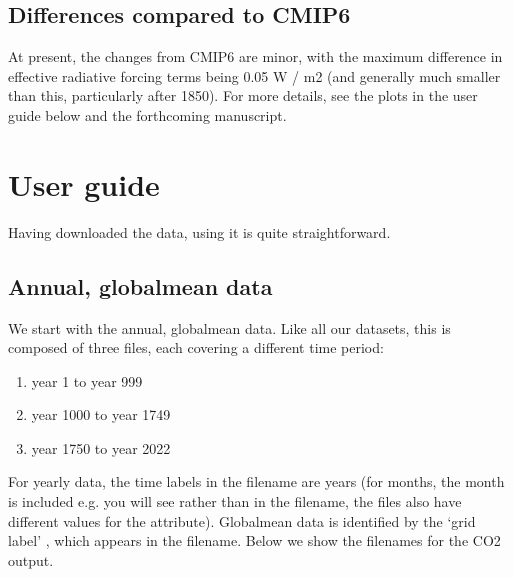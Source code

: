\documentclass[letterpaper,10pt,english]{jupyterBook}
\begin{document}
\section{Differences compared to CMIP6}
\label{\detokenize{user-guide-historical:differences-compared-to-cmip6}}
\sphinxAtStartPar
At present, the changes from CMIP6 are minor,
with the maximum difference in effective radiative forcing terms
being 0.05 W / m2
(and generally much smaller than this, particularly after 1850).
For more details, see the plots in the user guide below
and the forthcoming manuscript.


\chapter{User guide}
\label{\detokenize{user-guide-historical:user-guide}}
\sphinxAtStartPar
Having downloaded the data, using it is quite straightforward.


\section{Annual\sphinxhyphen{}, global\sphinxhyphen{}mean data}
\label{\detokenize{user-guide-historical:annual-global-mean-data}}
\sphinxAtStartPar
We start with the annual\sphinxhyphen{}, global\sphinxhyphen{}mean data.
Like all our datasets, this is composed of three files,
each covering a different time period:
\begin{enumerate}
%
\item {}
\sphinxAtStartPar
year 1 to year 999

\item {}
\sphinxAtStartPar
year 1000 to year 1749

\item {}
\sphinxAtStartPar
year 1750 to year 2022

\end{enumerate}

\sphinxAtStartPar
For yearly data, the time labels in the filename are years
(for months, the month is included e.g. you will see 
rather than  in the filename,
the files also have different values for the  attribute).
Global\sphinxhyphen{}mean data is identified by the ‘grid label’ ,
which appears in the filename.
Below we show the filenames for the CO2 output.
\end{document}
